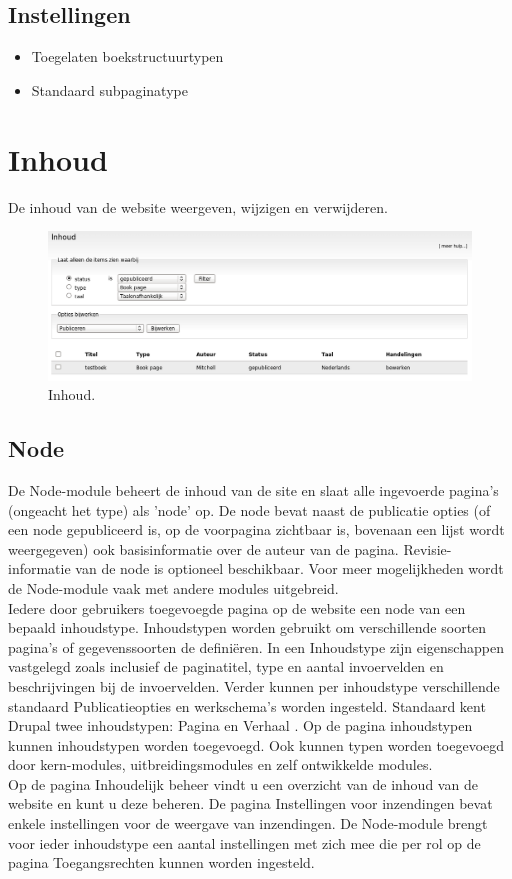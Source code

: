 \subsection{Instellingen}
\begin{itemize}
\item Toegelaten boekstructuurtypen
\item Standaard subpaginatype
\end{itemize}

\section{Inhoud}
De inhoud van de website weergeven, wijzigen en verwijderen.
 \begin{figure}[!h]
    \centering
   \includegraphics[scale=0.3,angle=0]{inhoud}
   \caption{Inhoud.\label{white}}
 \end{figure}
 \subsection{Node} 
De Node-module  beheert de inhoud van de site en slaat alle
ingevoerde pagina's (ongeacht het type) als 'node' op. De node bevat naast de publicatie opties (of een node gepubliceerd is, op de voorpagina zichtbaar is, bovenaan een
lijst wordt weergegeven) ook basisinformatie over de auteur van de pagina. Revisie-informatie van de node is
optioneel beschikbaar. Voor meer mogelijkheden wordt de Node-module vaak met andere modules uitgebreid.
\\
Iedere door gebruikers toegevoegde pagina op de website een node van een bepaald inhoudstype. Inhoudstypen
worden gebruikt om verschillende soorten pagina's of gegevenssoorten de defini\"eren. In een Inhoudstype zijn
eigenschappen vastgelegd zoals inclusief de paginatitel, type en aantal invoervelden en beschrijvingen bij de
invoervelden. Verder kunnen per inhoudstype verschillende standaard Publicatieopties en werkschema's worden ingesteld.
Standaard kent Drupal twee inhoudstypen:  Pagina
 en Verhaal . Op de pagina inhoudstypen kunnen
inhoudstypen worden toegevoegd. Ook kunnen typen worden toegevoegd door kern-modules, uitbreidingsmodules en zelf ontwikkelde modules.
\\
Op de pagina Inhoudelijk beheer vindt u een overzicht van de inhoud van de website en kunt u deze beheren.
De pagina Instellingen voor inzendingen bevat enkele instellingen voor de weergave van inzendingen.
De Node-module brengt voor ieder inhoudstype een aantal instellingen met zich mee die per rol op de
pagina Toegangsrechten kunnen worden ingesteld.

